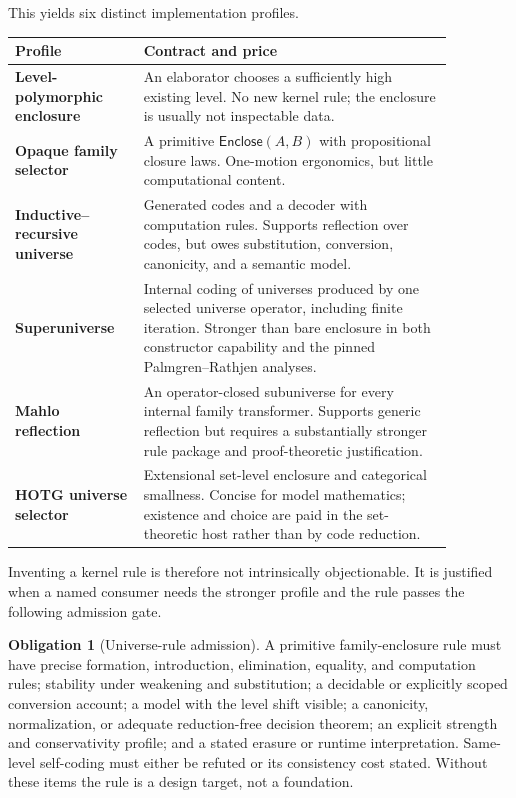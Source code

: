 \documentclass[11pt]{article}
\theoremstyle{definition}
\newtheorem{obligation}[theorem]{Obligation}
\theoremstyle{remark}
\begin{document}
This yields six distinct implementation profiles.

\begin{center}
\begin{tabular}{>{\raggedright\arraybackslash\bfseries}p{0.25\linewidth}
                >{\raggedright\arraybackslash}p{0.62\linewidth}}
\toprule
Profile & Contract and price \\
\midrule
Level-polymorphic enclosure & An elaborator chooses a sufficiently high existing
  level.  No new kernel rule; the enclosure is usually not inspectable data. \\
Opaque family selector & A primitive $\mathsf{Enclose}(A,B)$ with propositional
  closure laws.  One-motion ergonomics, but little computational content. \\
Inductive--recursive universe & Generated codes and a decoder with computation
  rules.  Supports reflection over codes, but owes substitution, conversion,
  canonicity, and a semantic model. \\
Superuniverse & Internal coding of universes produced by one selected
  universe operator, including finite iteration.  Stronger than bare enclosure
  in both constructor capability and the pinned Palmgren--Rathjen analyses. \\
Mahlo reflection & An operator-closed subuniverse for every internal family
  transformer.  Supports generic reflection but requires a substantially
  stronger rule package and proof-theoretic justification. \\
HOTG universe selector & Extensional set-level enclosure and categorical
  smallness.  Concise for model mathematics; existence and choice are paid in
  the set-theoretic host rather than by code reduction. \\
\bottomrule
\end{tabular}
\end{center}

Inventing a kernel rule is therefore not intrinsically objectionable.  It is
justified when a named consumer needs the stronger profile and the rule passes
the following admission gate.

\begin{obligation}[Universe-rule admission]
A primitive family-enclosure rule must have precise formation, introduction,
elimination, equality, and computation rules; stability under weakening and
substitution; a decidable or explicitly scoped conversion account; a model with
the level shift visible; a canonicity, normalization, or adequate
reduction-free decision theorem; an explicit strength and conservativity
profile; and a stated erasure or runtime interpretation.  Same-level self-coding
must either be refuted or its consistency cost stated.  Without these items the
rule is a design target, not a foundation.
\end{obligation}
\end{document}
